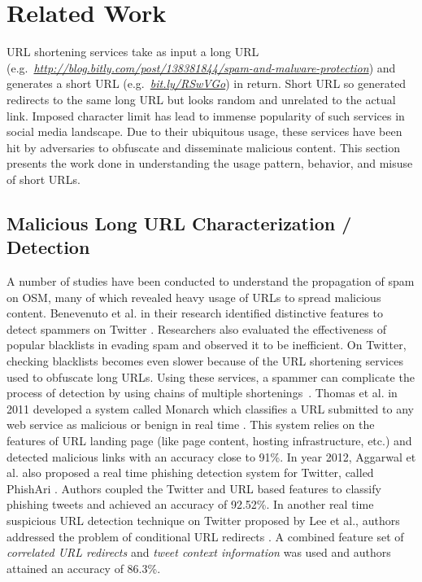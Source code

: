 \documentclass[conference]{IEEEtran}
\begin{document}
\section{Related Work}
\vspace{4pt}
URL shortening services take as input a long URL (e.g.~\textit{\url{http://blog.bitly.com/post/138381844/spam-and-malware-protection}}) and generates a short URL (e.g.~\textit{\url{bit.ly/RSwVGo}}) in return. Short URL so generated redirects to the same long URL but looks random and unrelated to the actual link. Imposed character limit has lead to immense popularity of such services in social media landscape. Due to their ubiquitous usage, these services have been hit by adversaries to obfuscate and disseminate malicious content. This section presents the work done in understanding the usage pattern, behavior, and misuse of short URLs.
\subsection{Malicious Long URL Characterization / Detection}
\vspace{4pt}
A number of studies have been conducted to understand the propagation of spam on OSM, many of which revealed heavy usage of URLs to spread malicious content. Benevenuto et al. in their research identified distinctive features to detect spammers on Twitter \cite{8}. Researchers also evaluated the effectiveness of popular blacklists in evading spam and observed it to be inefficient. On Twitter, checking blacklists becomes even slower because of the URL shortening services used to obfuscate long URLs. Using these services, a spammer can complicate the process of detection by using chains of multiple shortenings~\cite{10}. 
Thomas et al. in 2011 developed a system called Monarch which classifies a URL submitted to any web service as malicious or benign in real time \cite{6}. This system relies on the features of URL landing page (like page content, hosting infrastructure, etc.) and detected malicious links with an accuracy close to 91\%. In year 2012, Aggarwal et al. also proposed a real time phishing detection system for Twitter, called PhishAri \cite{9}. Authors coupled the Twitter and URL based features to classify phishing tweets and achieved an accuracy of 92.52\%. 
In another real time suspicious URL detection technique on Twitter proposed by Lee et al., authors addressed the problem of conditional URL redirects \cite{11}. A combined feature set of \textit{correlated URL redirects} and \textit{tweet context information} was used and authors attained an accuracy of 86.3\%. 
\end{document}
